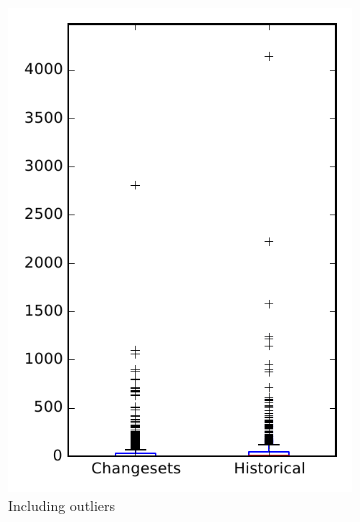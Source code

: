 
\begin{figure}
    \centering
    \begin{subfigure}{.4\textwidth}
        \centering
        \includegraphics[height=0.4\textheight]{figures/flt/rq2_overview}
        \caption{Including outliers}\label{fig:flt:rq2:overview_outlier}
    \end{subfigure}%
    \begin{subfigure}{.4\textwidth}
        \centering

\end{subfigure}
\end{figure}
